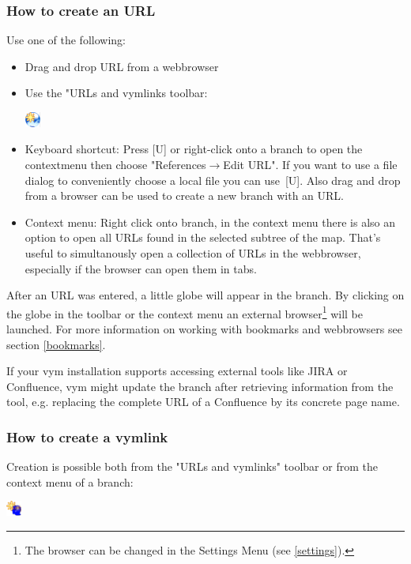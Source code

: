 \documentclass[12pt,a4paper]{article}
\newcommand{\vym}{{\sc vym }}
\newcommand{\ra}{$\longrightarrow$}
\newcommand{\key}[1]{[#1]}
\begin{document}
\subsubsection{How to create an URL} 
Use one of the following:
\begin{itemize}
\item{Drag and drop URL from a webbrowser}
\item{Use the "URLs and vymlinks toolbar:}
    \begin{center}
	\includegraphics[width=0.5cm]{images/flag-urlnew.png}
    \end{center}
\item{Keyboard shortcut:}
    Press \key{U} or right-click  onto a
    branch to open the contextmenu then choose "References\ra Edit URL". If
    you want to use a file dialog to conveniently choose a local file you
    can use~\key{U}. Also drag and drop from a browser can be used to create
    a new branch with an URL.
\item{Context menu:} 
    Right click onto branch,
    in the context menu there is also an option to open all URLs found
    in the selected subtree of the map. That's useful to simultanously open
    a collection of URLs in the webbrowser, especially if the browser can
    open them in tabs.

\end{itemize}

After an URL was entered, a little globe will appear in the branch. By
clicking on the globe in the toolbar or the context menu an external
browser\footnote{
    The browser can be changed in the Settings Menu (see \ref{settings}).}
will be launched.
For more information on working with bookmarks and webbrowsers see
section \ref{bookmarks}.

If your \vym installation supports accessing external tools like JIRA or
Confluence, \vym might update the branch after retrieving information
from the tool, e.g. replacing the complete URL of a Confluence by its
concrete page name. 
\subsubsection{How to create a vymlink}
Creation is possible both from the "URLs and vymlinks" toolbar or from
the context menu of a branch:
    \begin{center}
	\includegraphics[width=0.5cm]{images/flag-vymlinknew.png}
    \end{center}
\end{document}
